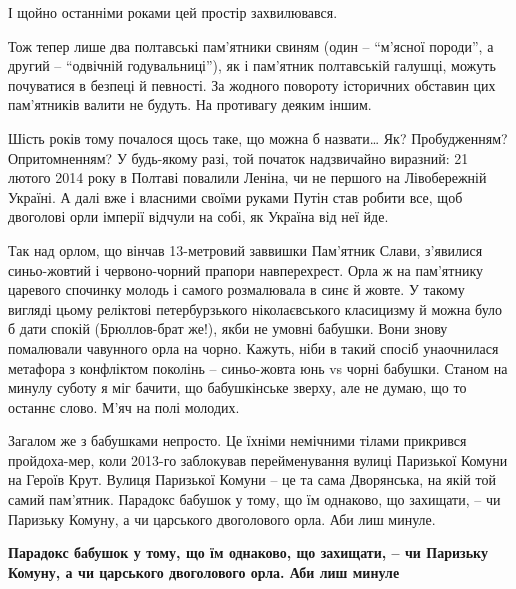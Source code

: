 І щойно останніми роками цей простір захвилювався.

Тож тепер лише два полтавські пам'ятники свиням (один – \enquote{м'ясної породи}, а
другий – \enquote{одвічній годувальниці}), як і пам'ятник полтавській галушці, можуть
почуватися в безпеці й певності. За жодного повороту історичних обставин цих
пам'ятників валити не будуть. На противагу деяким іншим.

Шість років тому почалося щось таке, що можна б назвати… Як? Пробудженням?
Опритомненням? У будь-якому разі, той початок надзвичайно виразний: 21 лютого
2014 року в Полтаві повалили Леніна, чи не першого на Лівобережній Україні. А
далі вже і власними своїми руками Путін став робити все, щоб двоголові орли
імперії відчули на собі, як Україна від неї йде.

Так над орлом, що вінчав 13-метровий заввишки Пам'ятник Слави, з'явилися
синьо-жовтий і червоно-чорний прапори навперехрест. Орла ж на пам'ятнику
царевого спочинку молодь і самого розмалювала в синє й жовте. У такому вигляді
цьому реліктові петербурзького ніколаєвського класицизму й можна було б дати
спокій (Брюллов-брат же!), якби не умовні бабушки. Вони знову помалювали
чавунного орла на чорно. Кажуть, ніби в такий спосіб унаочнилася метафора з
конфліктом поколінь – синьо-жовта юнь vs чорні бабушки. Станом на минулу суботу
я міг бачити, що бабушкінське зверху, але не думаю, що то останнє слово. М'яч
на полі молодих.

Загалом же з бабушками непросто. Це їхніми немічними тілами прикрився
пройдоха-мер, коли 2013-го заблокував перейменування вулиці Паризької Комуни на
Героїв Крут. Вулиця Паризької Комуни – це та сама Дворянська, на якій той самий
пам'ятник. Парадокс бабушок у тому, що їм однаково, що захищати, – чи Паризьку
Комуну, а чи царського двоголового орла. Аби лиш минуле.

\begin{leftbar}
	\bfseries
Парадокс бабушок у тому, що їм однаково, що захищати, – чи Паризьку Комуну, а
чи царського двоголового орла. Аби лиш минуле
\end{leftbar}
